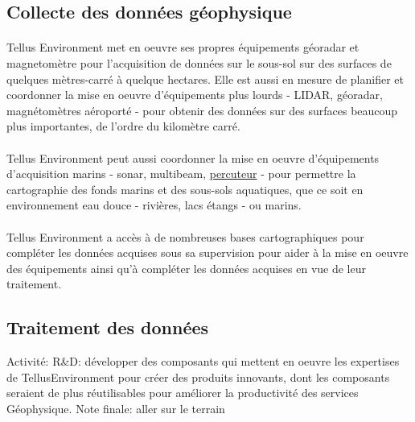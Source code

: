 \documentclass[12pt,a4paper]{report}
\begin{document}
	\subsection{Collecte des données géophysique}
	
	\paragraph*{} Tellus Environment met en oeuvre ses propres équipements géoradar et magnetomètre pour l'acquisition de données sur le sous-sol sur des surfaces de quelques mètres-carré à quelque hectares. Elle est aussi en mesure de planifier et coordonner la mise en oeuvre d'équipements plus lourds - LIDAR, géoradar, magnétomètres aéroporté - pour obtenir des données sur des surfaces beaucoup plus importantes, de l'ordre du kilomètre carré.
	
	
	\paragraph*{} Tellus Environment peut aussi coordonner la mise en oeuvre d'équipements d'acquisition marins - sonar, multibeam, \underline{percuteur}  - pour permettre la cartographie des fonds marins et des sous-sols aquatiques, que ce soit en environnement eau douce - rivières, lacs étangs - ou marins. 
	
	\paragraph*{} Tellus Environment a accès à de nombreuses bases cartographiques pour compléter les données acquises sous sa supervision pour aider à la mise en oeuvre des équipements ainsi qu'à compléter les données acquises en vue de leur traitement.

\subsection{Traitement des données}


Activité: R\&D: développer des composants qui mettent en oeuvre les expertises de TellusEnvironment pour créer des produits innovants, dont les composants seraient de plus réutilisables pour améliorer la productivité des services Géophysique.
Note finale: aller sur le terrain
\end{document}
